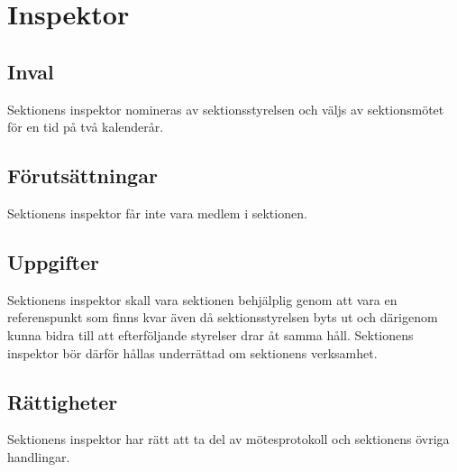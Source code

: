 \section{Inspektor}

\subsection{Inval}
Sektionens inspektor nomineras av sektionsstyrelsen och väljs av sektionsmötet för en tid på två kalenderår.

\subsection{Förutsättningar}
Sektionens inspektor får inte vara medlem i sektionen.

\subsection{Uppgifter}
Sektionens inspektor skall vara sektionen behjälplig genom att vara en referenspunkt som finns kvar även då sektionsstyrelsen byts ut och därigenom kunna bidra till att efterföljande styrelser drar åt samma håll. Sektionens inspektor bör därför hållas underrättad om sektionens verksamhet.

\subsection{Rättigheter}
Sektionens inspektor har rätt att ta del av mötesprotokoll och sektionens övriga handlingar.